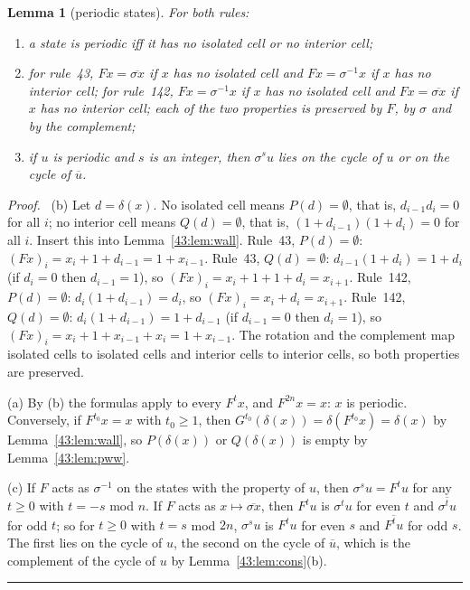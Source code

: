 \documentclass[10pt,a4paper]{article}
\newtheorem{lemma}[theorem]{Lemma}
\newcommand{\qedmark}{\rule{1.1ex}{1.1ex}}
\newenvironment{proof}[1][Proof]{\par\smallskip\noindent\textit{#1.}\ }{\hfill\qedmark\par\smallskip}
\newcommand{\cpl}[1]{\overline{#1}}           %
\begin{document}
\begin{lemma}[periodic states]\label{43:lem:per}
For both rules:
\begin{enumerate}[label=(\alph*),nosep,leftmargin=*]
\item a state is periodic iff it has no isolated cell or no interior cell;
\item for rule~43, $Fx=\cpl{\sigma x}$ if $x$ has no isolated cell and $Fx=\sigma^{-1}x$ if $x$ has no interior
cell; for rule~142, $Fx=\sigma^{-1}x$ if $x$ has no isolated cell and $Fx=\cpl{\sigma x}$ if $x$ has no interior
cell; each of the two properties is preserved by $F$, by $\sigma$ and by the complement;
\item if $u$ is periodic and $s$ is an integer, then $\sigma^su$ lies on the cycle of $u$ or on the cycle of
$\cpl{u}$.
\end{enumerate}
\end{lemma}
\begin{proof}
(b) Let $d=\delta(x)$. No isolated cell means $P(d)=\emptyset$, that is, $d_{i-1}d_i=0$ for all $i$; no interior
cell means $Q(d)=\emptyset$, that is, $(1+d_{i-1})(1+d_i)=0$ for all $i$. Insert this into
Lemma~\ref{43:lem:wall}.
Rule~43, $P(d)=\emptyset$: $(Fx)_i=x_i+1+d_{i-1}=1+x_{i-1}$.
Rule~43, $Q(d)=\emptyset$: $d_{i-1}(1+d_i)=1+d_i$ (if $d_i=0$ then $d_{i-1}=1$), so $(Fx)_i=x_i+1+1+d_i=x_{i+1}$.
Rule~142, $P(d)=\emptyset$: $d_i(1+d_{i-1})=d_i$, so $(Fx)_i=x_i+d_i=x_{i+1}$.
Rule~142, $Q(d)=\emptyset$: $d_i(1+d_{i-1})=1+d_{i-1}$ (if $d_{i-1}=0$ then $d_i=1$), so
$(Fx)_i=x_i+1+x_{i-1}+x_i=1+x_{i-1}$.
The rotation and the complement map isolated cells to isolated cells and interior cells to interior cells, so
both properties are preserved.

(a) By (b) the formulas apply to every $F^tx$, and $F^{2n}x=x$: $x$ is periodic. Conversely, if $F^{t_0}x=x$ with
$t_0\ge 1$, then $G^{t_0}(\delta(x))=\delta(F^{t_0}x)=\delta(x)$ by Lemma~\ref{43:lem:wall}, so
$P(\delta(x))$ or $Q(\delta(x))$ is empty by Lemma~\ref{43:lem:pww}.

(c) If $F$ acts as $\sigma^{-1}$ on the states with the property of $u$, then $\sigma^su=F^tu$ for any $t\ge 0$
with $t=-s$ mod $n$. If $F$ acts as $x\mapsto\cpl{\sigma x}$, then $F^tu$ is $\sigma^tu$ for even $t$ and
$\cpl{\sigma^tu}$ for odd $t$; so for $t\ge 0$ with $t=s$ mod $2n$, $\sigma^su$ is $F^tu$ for even $s$ and
$\cpl{F^tu}$ for odd $s$. The first lies on the cycle of $u$, the second on the cycle of $\cpl{u}$, which is the
complement of the cycle of $u$ by Lemma~\ref{43:lem:cons}(b).
\end{proof}
\end{document}
